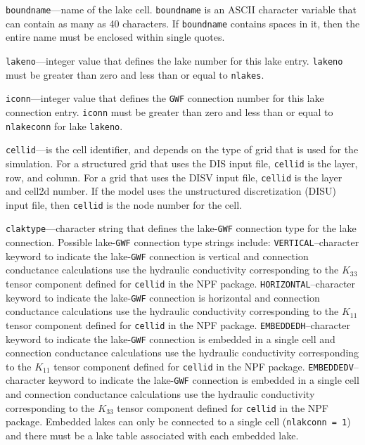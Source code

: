 \item \texttt{boundname}---name of the lake cell.  \texttt{boundname} is an ASCII character variable that can contain as many as 40 characters.  If \texttt{boundname} contains spaces in it, then the entire name must be enclosed within single quotes.

\item \texttt{lakeno}---integer value that defines the lake number for this lake entry. \texttt{lakeno} must be greater than zero and less than or equal to \texttt{nlakes}.

\item \texttt{iconn}---integer value that defines the \texttt{GWF} connection number for this lake connection entry. \texttt{iconn} must be greater than zero and less than or equal to \texttt{nlakeconn} for lake \texttt{lakeno}.

\item \texttt{cellid}---is the cell identifier, and depends on the type of grid that is used for the simulation.  For a structured grid that uses the DIS input file, \texttt{cellid} is the layer, row, and column.   For a grid that uses the DISV input file, \texttt{cellid} is the layer and cell2d number.  If the model uses the unstructured discretization (DISU) input file, then \texttt{cellid} is the node number for the cell.

\item \texttt{claktype}---character string that defines the lake-\texttt{GWF} connection type for the lake connection. Possible lake-\texttt{GWF} connection type strings include:  \texttt{VERTICAL}--character keyword to indicate the lake-\texttt{GWF} connection is vertical  and connection conductance calculations use the hydraulic conductivity corresponding to the $K_{33}$ tensor component defined for \texttt{cellid} in the NPF package. \texttt{HORIZONTAL}--character keyword to indicate the lake-\texttt{GWF} connection is horizontal and connection conductance calculations use the hydraulic conductivity corresponding to the $K_{11}$ tensor component defined for \texttt{cellid} in the NPF package. \texttt{EMBEDDEDH}--character keyword to indicate the lake-\texttt{GWF} connection is embedded in a single cell and connection conductance calculations use the hydraulic conductivity corresponding to the $K_{11}$ tensor component defined for \texttt{cellid} in the NPF package. \texttt{EMBEDDEDV}--character keyword to indicate the lake-\texttt{GWF} connection is embedded in a single cell and connection conductance calculations use the hydraulic conductivity corresponding to the $K_{33}$ tensor component defined for \texttt{cellid} in the NPF package. Embedded lakes can only be connected to a single cell (\texttt{nlakconn = 1}) and there must be a lake table associated with each embedded lake.

